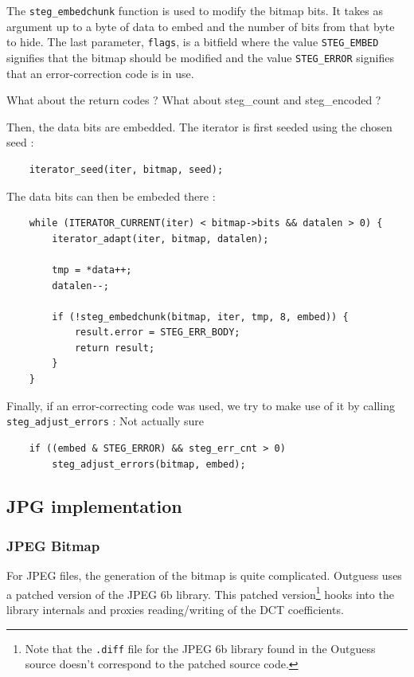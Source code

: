 \documentclass{article}
\begin{document}
The \texttt{steg\_embedchunk} function is used to modify the bitmap bits. It takes as argument up to a byte of data to embed and the number of bits from that byte to hide. The last parameter, \texttt{flags}, is a bitfield where the value \texttt{STEG\_EMBED} signifies that the bitmap should be modified and the value \texttt{STEG\_ERROR} signifies that an error-correction code is in use.

{\color{red} What about the return codes ? What about steg\_count and steg\_encoded ?}

Then, the data bits are embedded. The iterator is first seeded using the chosen seed :
\begin{verbatim}
	iterator_seed(iter, bitmap, seed);
\end{verbatim}

The data bits can then be embeded there :
\begin{verbatim}
	while (ITERATOR_CURRENT(iter) < bitmap->bits && datalen > 0) {
		iterator_adapt(iter, bitmap, datalen);
		
		tmp = *data++;
		datalen--;
		
		if (!steg_embedchunk(bitmap, iter, tmp, 8, embed)) {
			result.error = STEG_ERR_BODY;
			return result;
		}
	}
\end{verbatim}

Finally, if an error-correcting code was used, we try to make use of it by calling \texttt{steg\_adjust\_errors} : {\color{red} Not actually sure}
\begin{verbatim}
	if ((embed & STEG_ERROR) && steg_err_cnt > 0)
		steg_adjust_errors(bitmap, embed);
\end{verbatim}

{ \color{red}{TODO: Mention the return value} }

\subsection{JPG implementation}

\subsubsection{JPEG Bitmap}

For JPEG files, the generation of the bitmap is quite complicated. Outguess uses a patched version of the JPEG 6b library. This patched version\footnote{Note that the \texttt{.diff} file for the JPEG 6b library found in the Outguess source doesn't correspond to the patched source code.} hooks into the library internals and proxies reading/writing of the DCT coefficients.
\end{document}

